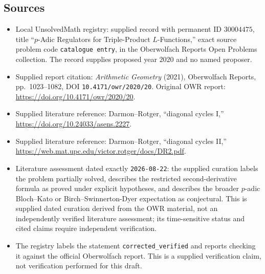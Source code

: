 \documentclass[11pt]{article}
\begin{document}
\subsection{Sources}
\begin{itemize}
\item Local UnsolvedMath registry: supplied record with permanent ID \(30004475\), title ``\(p\)-Adic Regulators for Triple-Product \(L\)-Functions,'' exact source problem code \texttt{catalogue entry}, in the Oberwolfach Reports Open Problems collection. The record supplies proposed year \(2020\) and no named proposer.
\item Supplied report citation: \emph{Arithmetic Geometry} (2021), Oberwolfach Reports, pp.~1023--1082, DOI \texttt{10.4171/owr/2020/20}. Original OWR report: \url{https://doi.org/10.4171/owr/2020/20}.
\item Supplied literature reference: Darmon--Rotger, ``diagonal cycles I,'' \url{https://doi.org/10.24033/asens.2227}.
\item Supplied literature reference: Darmon--Rotger, ``diagonal cycles II,'' \url{https://web.mat.upc.edu/victor.rotger/docs/DR2.pdf}.
\item Literature assessment dated exactly \texttt{2026-08-22}: the supplied curation labels the problem partially solved, describes the restricted second-derivative formula as proved under explicit hypotheses, and describes the broader \(p\)-adic Bloch--Kato or Birch--Swinnerton-Dyer expectation as conjectural. This is supplied dated curation derived from the OWR material, not an independently verified literature assessment; its time-sensitive status and cited claims require independent verification.
\item The registry labels the statement \texttt{corrected\_verified} and reports checking it against the official Oberwolfach report. This is a supplied verification claim, not verification performed for this draft.
\end{itemize}
\end{document}
